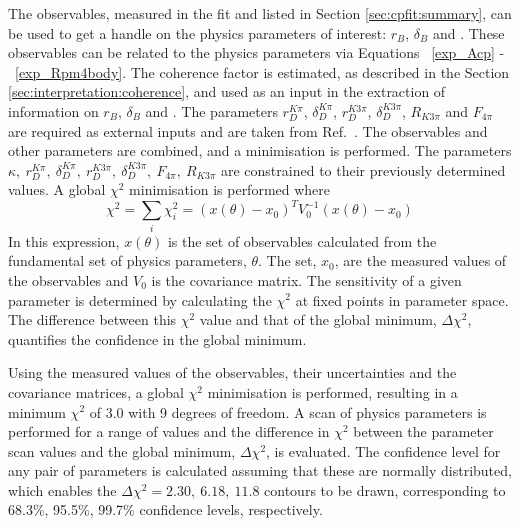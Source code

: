 The \CP observables, measured in the \CP fit and listed in Section \ref{sec:cpfit:summary}, can be used to get a handle on the physics parameters of interest: $r_B$, $\delta_B$ and \Pgamma. These observables can be related to the physics parameters via Equations ~\ref{exp_Acp} - ~\ref{exp_Rpm4body}. The coherence factor is estimated, as described in the Section \ref{sec:interpretation:coherence}, and used as an input in the extraction of information on $r_B$, $\delta_B$ and \Pgamma. The parameters $r_D^{K\pi}$, $\delta_D^{K\pi}$, $r_D^{K3\pi}$, $\delta_D^{K3\pi}$, $R_{K3\pi}$ and $F_{4\pi}$ are required as external inputs and are taken from Ref.~\cite{HFAG,charmk3pi,LHCb-PAPER-2015-057,charm4pi}. The \CP observables and other parameters are combined, and a minimisation is performed. The parameters $\kappa,\ r_D^{K\pi},\ \delta_D^{K\pi},\ r_D^{K3\pi},\ \delta_D^{K3\pi},\ F_{4\pi},\ R_{K3\pi}$ are constrained to their previously determined values. A global $\chi^2$ minimisation is performed where
\begin{equation}
\chi^2 = \sum_i \chi^2_i = (x(\theta) - x_0)^TV_0^{-1}(x(\theta)-x_0)
\end{equation}
In this expression, $x(\theta)$ is the set of observables calculated from the fundamental set of physics parameters, $\theta$. The set, $x_0$, are the measured values of the observables and $V_0$ is the covariance matrix. The sensitivity of a given parameter is determined by calculating the $\chi^2$ at fixed points in parameter space. The difference between this $\chi^2$ value and that of the global minimum, $\Delta\chi^2$, quantifies the confidence in the global minimum. 

Using the measured values of the \CP observables, their uncertainties and the covariance matrices, a global $\chi^2$ minimisation is performed, resulting in a minimum $\chi^2$ of 3.0 with 9 degrees of freedom. A scan of physics parameters is performed for a range of values and the difference in $\chi^2$ between the parameter scan values and the global minimum, $\Delta\chi^2$, is evaluated. The confidence level for any pair of parameters is calculated assuming that these are normally distributed, which enables the $\Delta \chi^2 = 2.30,\ 6.18,\ 11.8$ contours to be drawn, corresponding to 68.3\%, 95.5\%, 99.7\% confidence levels, respectively. 

